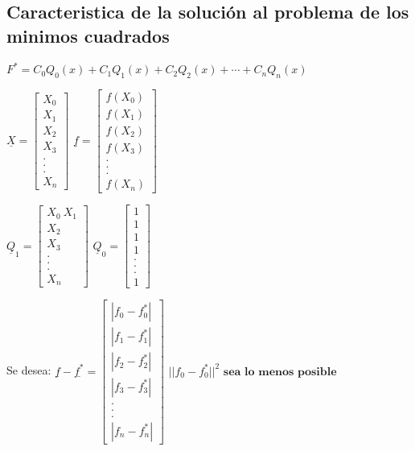 \documentclass[12pt]{article}
\begin{document}
\subsection*{Caracteristica de la solución al problema de los minimos cuadrados}

$\displaystyle F^* = C_0Q_0(x)+ C_1Q_1(x)+ C_2Q_2(x)+\cdots+ C_nQ_n(x)$

{\large $ \underline X = \left[
\begin{array}{c}
X_0 \\
X_1 \\
X_2\\
X_3 \\
. \\
. \\
. \\
X_n
\end{array}
\right]$ }
{\large $ \underline f = \left[
\begin{array}{c}
f(X_0)\\
f(X_1) \\
f(X_2)\\
f(X_3) \\
. \\
. \\
. \\
f(X_n)
\end{array}
\right]$}

{\large $ \underline Q_1 = \left[
\begin{array}{c}
X_0\
X_1 \\
X_2\\
X_3 \\
. \\
. \\
. \\
X_n
\end{array}
\right]$}
{\large $ \underline Q_0= \left[
\begin{array}{c}
1\\
1 \\
1\\
1 \\
. \\
. \\
. \\
1
\end{array}
\right]$}

Se desea: {\large $ \underline f - \underline{f^*} = \left[
\begin{array}{c}
|f_0-f^*_0| \\
|f_1-f^*_1| \\
|f_2-f^*_2|\\
|f_3-f^*_3| \\
. \\
. \\
. \\
|f_n-f^*_n|
\end{array}
\right]$}
$||f_0-f^*_0||^2 \textbf{ sea lo menos posible}$
\end{document}
